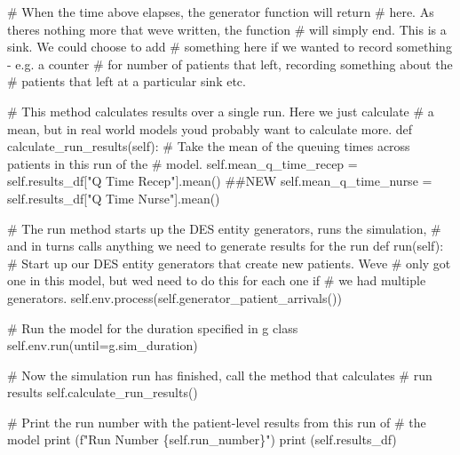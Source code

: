 \documentclass[
  letterpaper,
  DIV=11,
  numbers=noendperiod]{scrreprt}
\newenvironment{Shaded}{}{}
\newcommand{\BuiltInTok}[1]{\textcolor[rgb]{0.84,0.23,0.29}{#1}}
\newcommand{\CommentTok}[1]{\textcolor[rgb]{0.42,0.45,0.49}{#1}}
\newcommand{\KeywordTok}[1]{\textcolor[rgb]{0.84,0.23,0.29}{#1}}
\newcommand{\NormalTok}[1]{\textcolor[rgb]{0.14,0.16,0.18}{#1}}
\newcommand{\OperatorTok}[1]{\textcolor[rgb]{0.14,0.16,0.18}{#1}}
\newcommand{\SpecialCharTok}[1]{\textcolor[rgb]{0.00,0.36,0.77}{#1}}
\newcommand{\SpecialStringTok}[1]{\textcolor[rgb]{0.01,0.18,0.38}{#1}}
\newcommand{\StringTok}[1]{\textcolor[rgb]{0.01,0.18,0.38}{#1}}
\newcommand{\VariableTok}[1]{\textcolor[rgb]{0.89,0.38,0.04}{#1}}
\begin{document}
\begin{tcolorbox}
\begin{Shaded}
\begin{Highlighting}[]
            \CommentTok{\# When the time above elapses, the generator function will return}
            \CommentTok{\# here.  As there\textquotesingle{}s nothing more that we\textquotesingle{}ve written, the function}
            \CommentTok{\# will simply end.  This is a sink.  We could choose to add}
            \CommentTok{\# something here if we wanted to record something {-} e.g. a counter}
            \CommentTok{\# for number of patients that left, recording something about the}
            \CommentTok{\# patients that left at a particular sink etc.}

    \CommentTok{\# This method calculates results over a single run.  Here we just calculate}
    \CommentTok{\# a mean, but in real world models you\textquotesingle{}d probably want to calculate more.}
    \KeywordTok{def}\NormalTok{ calculate\_run\_results(}\VariableTok{self}\NormalTok{):}
        \CommentTok{\# Take the mean of the queuing times across patients in this run of the}
        \CommentTok{\# model.}
        \VariableTok{self}\NormalTok{.mean\_q\_time\_recep }\OperatorTok{=} \VariableTok{self}\NormalTok{.results\_df[}\StringTok{"Q Time Recep"}\NormalTok{].mean() }\CommentTok{\#\#NEW}
        \VariableTok{self}\NormalTok{.mean\_q\_time\_nurse }\OperatorTok{=} \VariableTok{self}\NormalTok{.results\_df[}\StringTok{"Q Time Nurse"}\NormalTok{].mean()}

    \CommentTok{\# The run method starts up the DES entity generators, runs the simulation,}
    \CommentTok{\# and in turns calls anything we need to generate results for the run}
    \KeywordTok{def}\NormalTok{ run(}\VariableTok{self}\NormalTok{):}
        \CommentTok{\# Start up our DES entity generators that create new patients.  We\textquotesingle{}ve}
        \CommentTok{\# only got one in this model, but we\textquotesingle{}d need to do this for each one if}
        \CommentTok{\# we had multiple generators.}
        \VariableTok{self}\NormalTok{.env.process(}\VariableTok{self}\NormalTok{.generator\_patient\_arrivals())}

        \CommentTok{\# Run the model for the duration specified in g class}
        \VariableTok{self}\NormalTok{.env.run(until}\OperatorTok{=}\NormalTok{g.sim\_duration)}

        \CommentTok{\# Now the simulation run has finished, call the method that calculates}
        \CommentTok{\# run results}
        \VariableTok{self}\NormalTok{.calculate\_run\_results()}

        \CommentTok{\# Print the run number with the patient{-}level results from this run of}
        \CommentTok{\# the model}
        \BuiltInTok{print}\NormalTok{ (}\SpecialStringTok{f"Run Number }\SpecialCharTok{\{}\VariableTok{self}\SpecialCharTok{.}\NormalTok{run\_number}\SpecialCharTok{\}}\SpecialStringTok{"}\NormalTok{)}
        \BuiltInTok{print}\NormalTok{ (}\VariableTok{self}\NormalTok{.results\_df)}


\end{Highlighting}
\end{Shaded}
\end{tcolorbox}
\end{document}
